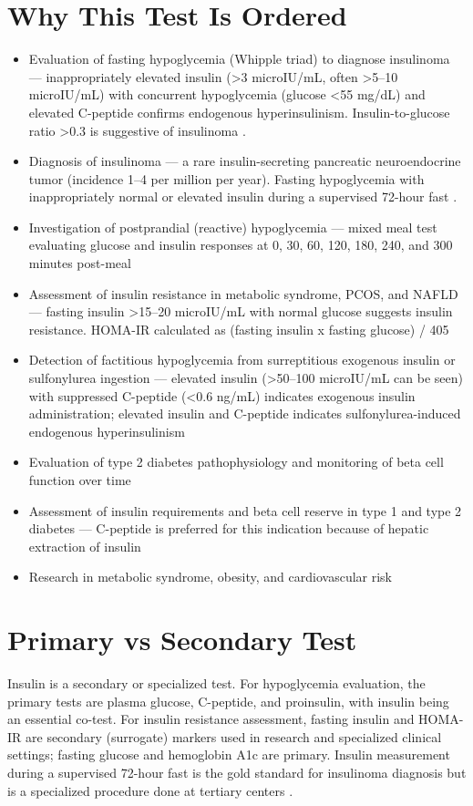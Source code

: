 \section*{Why This Test Is Ordered}
\begin{itemize}
  \item Evaluation of fasting hypoglycemia (Whipple triad) to diagnose insulinoma --- inappropriately elevated insulin (>3 microIU/mL, often >5--10 microIU/mL) with concurrent hypoglycemia (glucose <55 mg/dL) and elevated C-peptide confirms endogenous hyperinsulinism. Insulin-to-glucose ratio >0.3 is suggestive of insulinoma \cite{service1995hypoglycemic}.
  \item Diagnosis of insulinoma --- a rare insulin-secreting pancreatic neuroendocrine tumor (incidence 1--4 per million per year). Fasting hypoglycemia with inappropriately normal or elevated insulin during a supervised 72-hour fast \cite{deherder2006welldifferentiated}.
  \item Investigation of postprandial (reactive) hypoglycemia --- mixed meal test evaluating glucose and insulin responses at 0, 30, 60, 120, 180, 240, and 300 minutes post-meal
  \item Assessment of insulin resistance in metabolic syndrome, PCOS, and NAFLD --- fasting insulin >15--20 microIU/mL with normal glucose suggests insulin resistance. HOMA-IR calculated as (fasting insulin x fasting glucose) / 405
  \item Detection of factitious hypoglycemia from surreptitious exogenous insulin or sulfonylurea ingestion --- elevated insulin (>50--100 microIU/mL can be seen) with suppressed C-peptide (<0.6 ng/mL) indicates exogenous insulin administration; elevated insulin and C-peptide indicates sulfonylurea-induced endogenous hyperinsulinism
  \item Evaluation of type 2 diabetes pathophysiology and monitoring of beta cell function over time
  \item Assessment of insulin requirements and beta cell reserve in type 1 and type 2 diabetes --- C-peptide is preferred for this indication because of hepatic extraction of insulin
  \item Research in metabolic syndrome, obesity, and cardiovascular risk
\end{itemize}

\section*{Primary vs Secondary Test}
Insulin is a secondary or specialized test. For hypoglycemia evaluation, the primary tests are plasma glucose, C-peptide, and proinsulin, with insulin being an essential co-test. For insulin resistance assessment, fasting insulin and HOMA-IR are secondary (surrogate) markers used in research and specialized clinical settings; fasting glucose and hemoglobin A1c are primary. Insulin measurement during a supervised 72-hour fast is the gold standard for insulinoma diagnosis but is a specialized procedure done at tertiary centers \cite{cryer2009evaluation}.

